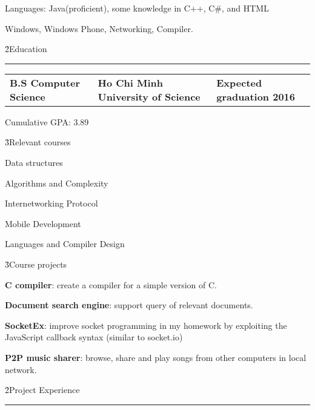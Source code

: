 \documentclass[a4paper]{article}
\makeatletter
\newcommand{\bold}[1]{\textbf{#1}}
\newcommand{\separator}{\noindent\rule[0.2cm]{\linewidth}{0.1pt}}
\newcommand{\threeCols}[3]{%
\noindent
\begin{tabu} to \linewidth {@{} X[m]X[c,m]X[r,m] @{}}
  \bold{#1} & \bold{#2} & \bold{#3} \\
\end{tabu}%
}
\let\tempone\itemize
\let\temptwo\enditemize
\renewenvironment{itemize}{\tempone[leftmargin=0.5cm]\setlength{\itemsep}{0cm}}{\temptwo}
\makeatother
\begin{document}
\vspace{-2.5mm}
\begin{itemize}
\item Languages: Java(proficient), some knowledge in C++, C\#, and HTML
\item Windows, Windows Phone, Networking, Compiler.
\end{itemize}

\smallskip

\h2{Education}\\
\separator

\smallskip
\threeCols{B.S Computer Science}{Ho Chi Minh University of Science}{Expected graduation 2016}
\begin{itemize}
\item Cumulative GPA: 3.89
\end{itemize}

\h3{Relevant courses}
\begin{multicols}{3}
\noindent
	\begin{itemize}
	\item Data structures
	\item Algorithms and Complexity
	\item Internetworking Protocol
	\item Mobile Development
	\item Languages and Compiler Design
	\end{itemize}
\end{multicols}

\h3{Course projects}
\begin{itemize}
\item \bold{C compiler}: create a compiler for a simple version of C.
\item \bold{Document search engine}: support query of relevant documents.
\item \bold{SocketEx}: improve socket programming in my homework by exploiting the JavaScript callback syntax (similar to socket.io)
\item \bold{P2P music sharer}: browse, share and play songs from other computers in local network.
\end{itemize}

\smallskip

\h2{Project Experience}\\
\separator
\end{document}

